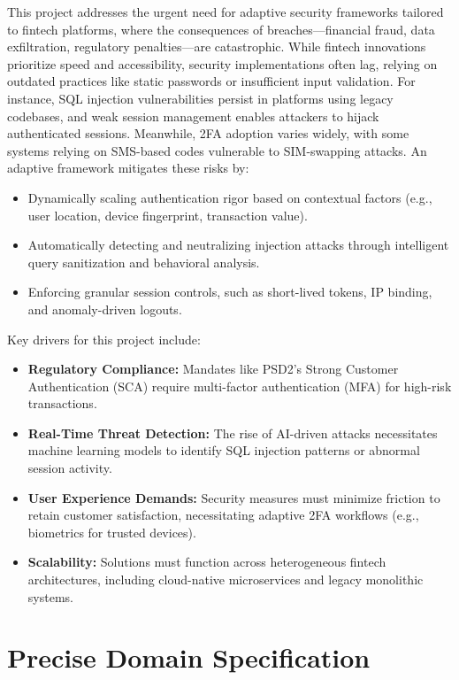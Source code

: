 This project addresses the urgent need for adaptive security frameworks tailored to fintech platforms, where the consequences of breaches—financial fraud, data exfiltration, regulatory penalties—are catastrophic. While fintech innovations prioritize speed and accessibility, security implementations often lag, relying on outdated practices like static passwords or insufficient input validation. For instance, SQL injection vulnerabilities persist in platforms using legacy codebases, and weak session management enables attackers to hijack authenticated sessions. Meanwhile, 2FA adoption varies widely, with some systems relying on SMS-based codes vulnerable to SIM-swapping attacks. An adaptive framework mitigates these risks by:
\begin{itemize}
\item Dynamically scaling authentication rigor based on contextual factors (e.g., user location, device fingerprint, transaction value).
\item Automatically detecting and neutralizing injection attacks through intelligent query sanitization and behavioral analysis.
\item Enforcing granular session controls, such as short-lived tokens, IP binding, and anomaly-driven logouts.
\end{itemize}
Key drivers for this project include:
\begin{itemize}
\item \textbf{Regulatory Compliance:} Mandates like PSD2’s Strong Customer Authentication (SCA) require multi-factor authentication (MFA) for high-risk transactions.
\item \textbf{Real-Time Threat Detection:} The rise of AI-driven attacks necessitates machine learning models to identify SQL injection patterns or abnormal session activity.
\item \textbf{User Experience Demands:} Security measures must minimize friction to retain customer satisfaction, necessitating adaptive 2FA workflows (e.g., biometrics for trusted devices).
\item \textbf{Scalability:} Solutions must function across heterogeneous fintech architectures, including cloud-native microservices and legacy monolithic systems.
\end{itemize}

\section*{Precise Domain Specification}

